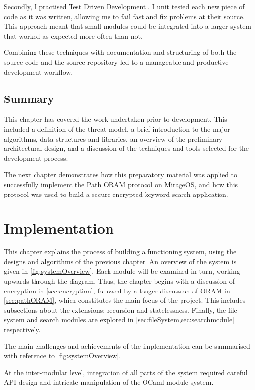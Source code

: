 \documentclass[12pt,a4paper,twoside,openright]{report}
\begin{document}
Secondly, I practised Test Driven Development \cite{hunt2004pragmatic}. I unit tested each new piece of code as it was written, allowing me to fail fast and fix problems at their source. This approach meant that small modules could be integrated into a larger system that worked as expected more often than not.

Combining these techniques with documentation and structuring of both the source code and the source repository led to a manageable and productive development workflow.

\section{Summary}

This chapter has covered the work undertaken prior to development. This included a definition of the threat model, a brief introduction to the major algorithms, data structures and libraries, an overview of the preliminary architectural design, and a discussion of the techniques and tools selected for the development process.

The next chapter demonstrates how this preparatory material was applied to successfully implement the Path ORAM protocol on MirageOS, and how this protocol was used to build a secure encrypted keyword search application.

\chapter{Implementation}

This chapter explains the process of building a functioning system, using the designs and algorithms of the previous chapter. An overview of the system is given in \cref{fig:systemOverview}. Each module will be examined in turn, working upwards through the diagram. Thus, the chapter begins with a discussion of encryption in \cref{sec:encryption}, followed by a longer discussion of ORAM in \cref{sec:pathORAM}, which constitutes the main focus of the project. This includes subsections about the extensions: recursion and statelessness. Finally, the file system and search modules are explored in \cref{sec:fileSystem,sec:searchmodule} respectively.

The main challenges and achievements of the implementation can be summarised with reference to \cref{fig:systemOverview}.

At the inter-modular level, integration of all parts of the system required careful API design and intricate manipulation of the OCaml module system.
\end{document}
